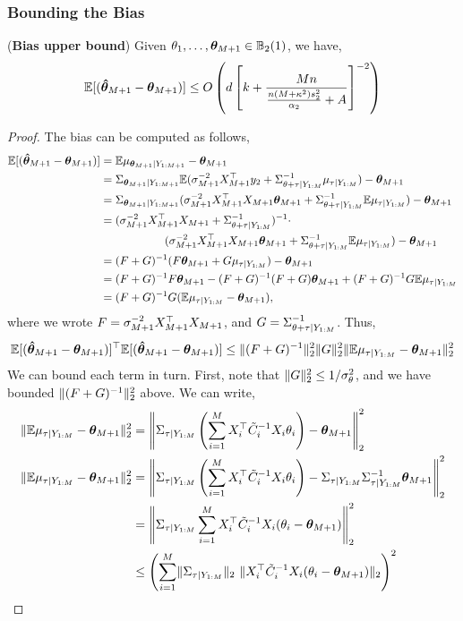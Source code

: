 \subsubsection{Bounding the Bias}
\begin{lemma}(\textbf{Bias upper bound})\label{lemma:bias_ubound}
Given $\theta_1,\ldots,\bm{\theta}_{M+1} \in \mathbb{B}_2(1)$, we have,
\[\mathbb{E}[(\bm{\hat{\theta}}_{M+1} - \bm{\theta}_{M+1})] \le O\left(d \left[ {k} + 
\frac{M{n}}{\frac{{n} (M +\kappa^2)s_2^2}{\alpha_2} + A} \right]^{-2}\right) \]
\end{lemma}
\begin{proof}
The bias can be computed as follows,
\begin{align}
\mathbb{E}[(\bm{\hat{\theta}}_{M+1} - \bm{\theta}_{M+1})] &= \mathbb{E} \mu_{\bm{\theta}_{M+1} \vert Y_{1:M+1}} - \bm{\theta}_{M+1}\\
&= \Sigma_{\bm{\theta}_{M+1} \vert Y_{1:M+1}} \mathbb{E} (\sigma_{M+1}^{-2} X_{M+1}^\top y_2 + \Sigma_{\theta + \tau \vert Y_{1:M}}^{-1} \mu_{\tau \vert Y_{1:M}}) - \bm{\theta}_{M+1} \\
&= \Sigma_{\bm{\theta}_{M+1} \vert Y_{1:M+1}} (\sigma_{M+1}^{-2} X_{M+1}^\top X_{M+1} \bm{\theta}_{M+1} + \Sigma_{\theta + \tau \vert Y_{1:M}}^{-1} \mathbb{E}\mu_{\tau \vert Y_{1:M}}) -\bm{\theta}_{M+1}\\
&= (\sigma_{M+1}^{-2} X_{M+1}^\top X_{M+1} + \Sigma_{\theta + \tau \vert Y_{1:M}}^{-1})^{-1}\cdot\\
&\hspace{2cm}(\sigma_{M+1}^{-2} X_{M+1}^\top X_{M+1} \bm{\theta}_{M+1} + \Sigma_{\theta + \tau \vert Y_{1:M}}^{-1} \mathbb{E}\mu_{\tau \vert Y_{1:M}}) - \bm{\theta}_{M+1} \\
&= (F+G)^{-1} (F \bm{\theta}_{M+1} + G \mu_{\tau \vert Y_{1:M}}) - \bm{\theta}_{M+1}\\
&= (F+G)^{-1} F \bm{\theta}_{M+1} - (F+G)^{-1} (F + G) \bm{\theta}_{M+1} + (F+G)^{-1} G \mathbb{E}\mu_{\tau \vert Y_{1:M}}\\
&= (F+G)^{-1} G (\mathbb{E}\mu_{\tau \vert Y_{1:M}}- \bm{\theta}_{M+1}),
\end{align}
where we wrote $F = \sigma_{M+1}^{-2} X_{M+1}^\top X_{M+1}$, and $G = \Sigma_{\theta + \tau \vert Y_{1:M}}^{-1}$. Thus,
\[\mathbb{E}[(\bm{\hat{\theta}}_{M+1} - \bm{\theta}_{M+1})]^\top\mathbb{E}[(\bm{\hat{\theta}}_{M+1} - \bm{\theta}_{M+1})] \le \lVert (F+G)^{-1} \rVert_2^2\lVert G \rVert_2^2 \lVert \mathbb{E}\mu_{\tau \vert Y_{1:M}}- \bm{\theta}_{M+1} \rVert_2^2\]
We can bound each term in turn. First, note that $\lVert G \rVert_2^2 \le 1/{\sigma_\theta^2}$, and we have bounded $\lVert (F+G)^{-1} \rVert_2^2$ above. We can write,
\begin{align*}
    \norm{\bbE\muPosXTau- \thetaY}_2^2 &= \bignorm{\CovPosXTau\left(\sum^{M}_{i=1}\DXi{i}^\top \posC{i}^{-1}\DXi{i}\theta_i \right) - \thetaY}_2^2\\
    \norm{\bbE\muPosXTau- \thetaY}_2^2 &= \bignorm{\CovPosXTau\left(\sum^{M}_{i=1}\DXi{i}^\top \posC{i}^{-1}\DXi{i}\theta_i \right) - \CovPosXTau\CovPosXTau^{-1}\thetaY}_2^2\\
    &= \bignorm{\CovPosXTau \sum^{M}_{i=1}\DXi{i}^\top\posC{i}^{-1}\DXi{i}(\theta_i - \thetaY)}_2^2\\
    &\le \left(\sum^{M}_{i=1}\norm{\CovPosXTau}_2 \ \norm{\DXi{i}^\top\posC{i}^{-1}\DXi{i}(\theta_i - \thetaY)}_2\right)^2\\

\end{align*}
\end{proof}
